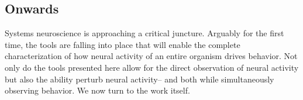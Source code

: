


\subsection{Onwards}
Systems neuroscience is approaching  a critical juncture. Arguably for the first time, the tools are falling into place that will enable the  complete characterization of how  neural activity of an entire organism drives behavior. Not only  do the tools presented here allow for the direct observation of neural activity but also the ability perturb neural activity-- and both while simultaneously observing behavior. We now turn to the work itself.


